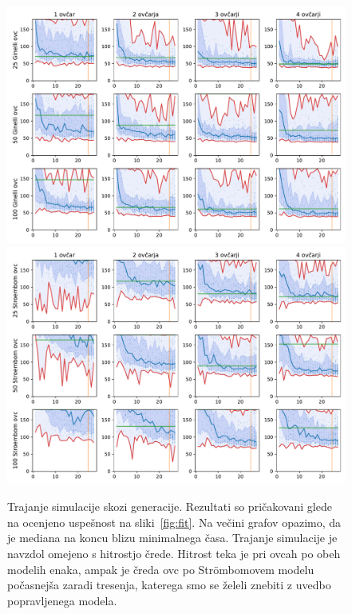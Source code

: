 \begin{figure}[H]  %
\centering
\includegraphics[height=0.4\textheight]{../poglavja/grafi/Ginelli-evolucija-MaxT.pdf}
\includegraphics[height=0.4\textheight]{../poglavja/grafi/Stroembom-evolucija-MaxT.pdf}
\caption[Trajanje simulacije skozi generacije]{Trajanje simulacije skozi generacije. Rezultati so pričakovani glede na ocenjeno uspešnost na sliki~\ref{fig:fit}. Na večini grafov opazimo, da je mediana na koncu blizu minimalnega časa. Trajanje simulacije je navzdol omejeno s hitrostjo črede. Hitrost teka je pri ovcah po obeh modelih enaka, ampak je čreda ovc po Str{\"o}mbomovem modelu počasnejša zaradi tresenja, katerega smo se želeli znebiti z uvedbo popravljenega modela.} %
\label{fig:maxt}
\end{figure}

